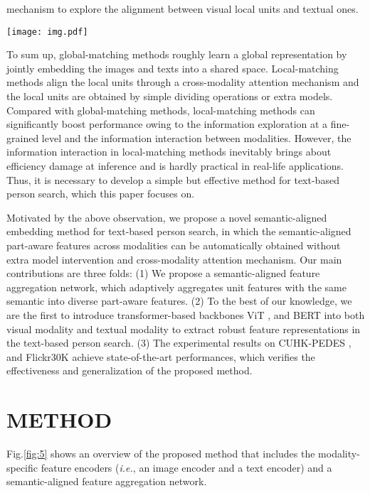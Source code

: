 \documentclass{article}
\begin{document}
mechanism to explore the alignment between visual local units and textual ones.
\begin{figure*}
\setlength{\abovecaptionskip}{0.5cm}
\setlength{\belowcaptionskip}{-0.5cm}
\centerline{\texttt{[image: img.pdf]}}
\vspace{-1em}\caption{The overall architecture of the proposed method. }

\label{fig:5}       \end{figure*}
\par
To sum up, global-matching methods roughly learn a
global representation by jointly embedding the images and
texts into a shared space. Local-matching methods align
the local units through a cross-modality attention mechanism and the local units are obtained by simple dividing operations or
extra models. Compared with global-matching methods, local-matching methods can significantly boost performance owing to the information exploration at a fine-grained level and the information interaction between modalities. However, the information interaction in local-matching methods inevitably brings about efficiency damage at inference and is hardly practical in real-life applications. Thus, it is necessary to develop a simple but effective
method for text-based person search, which this paper focuses on.
\par
Motivated by the above observation, we propose a novel semantic-aligned embedding method for text-based
person search, in which the semantic-aligned part-aware features across modalities can be automatically obtained without extra model intervention and cross-modality attention mechanism. Our main contributions are three folds: 
(1) We propose a semantic-aligned feature aggregation network, which adaptively aggregates unit features with the same semantic into diverse part-aware features.
(2) To the best of our knowledge, we are the first to introduce transformer-based backbones ViT \cite{dosovitskiy2021an}, and BERT \cite{devlin2018bert} into both visual modality and textual modality to extract robust feature representations in the text-based person search.
(3) The experimental results on CUHK-PEDES \cite{li2017person}, and Flickr30K \cite{young2014image} achieve state-of-the-art performances, which verifies the effectiveness and generalization of the proposed method.

\section{METHOD}
Fig.\ref{fig:5} shows an overview of the proposed method that includes the modality-specific feature encoders (\emph{i.e.}, an image encoder and a text encoder) and a semantic-aligned feature aggregation network.
\end{document}
